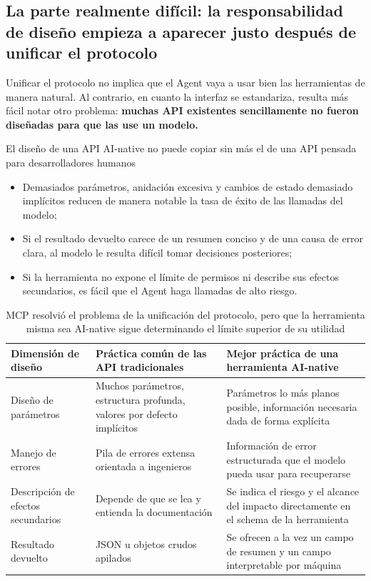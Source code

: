 \subsection{La parte realmente difícil: la responsabilidad de diseño empieza a aparecer justo después de unificar el protocolo}
Unificar el protocolo no implica que el Agent vaya a usar bien las herramientas de manera natural. Al contrario, en cuanto la interfaz se estandariza, resulta más fácil notar otro problema: \textbf{muchas API existentes sencillamente no fueron diseñadas para que las use un modelo.}

\begin{warningbox}{El diseño de una API AI-native no puede copiar sin más el de una API pensada para desarrolladores humanos}
\begin{itemize}
    \item Demasiados parámetros, anidación excesiva y cambios de estado demasiado implícitos reducen de manera notable la tasa de éxito de las llamadas del modelo;
    \item Si el resultado devuelto carece de un resumen conciso y de una causa de error clara, al modelo le resulta difícil tomar decisiones posteriores;
    \item Si la herramienta no expone el límite de permisos ni describe sus efectos secundarios, es fácil que el Agent haga llamadas de alto riesgo.
\end{itemize}
\end{warningbox}

\begin{table}[H]
\centering
\begin{tabular}{p{3.0cm}p{4.2cm}p{4.0cm}}
\toprule
\textbf{Dimensión de diseño} & \textbf{Práctica común de las API tradicionales} & \textbf{Mejor práctica de una herramienta AI-native} \\
\midrule
Diseño de parámetros & Muchos parámetros, estructura profunda, valores por defecto implícitos & Parámetros lo más planos posible, información necesaria dada de forma explícita \\
Manejo de errores & Pila de errores extensa orientada a ingenieros & Información de error estructurada que el modelo pueda usar para recuperarse \\
Descripción de efectos secundarios & Depende de que se lea y entienda la documentación & Se indica el riesgo y el alcance del impacto directamente en el schema de la herramienta \\
Resultado devuelto & JSON u objetos crudos apilados & Se ofrecen a la vez un campo de resumen y un campo interpretable por máquina \\
\bottomrule
\end{tabular}
\caption{MCP resolvió el problema de la unificación del protocolo, pero que la herramienta misma sea AI-native sigue determinando el límite superior de su utilidad}
\end{table}

